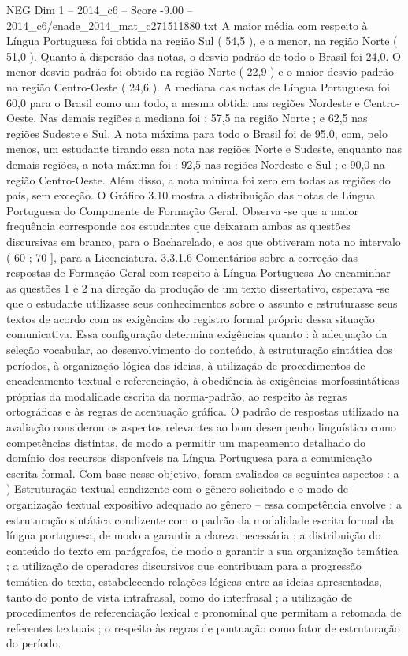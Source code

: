 \begin{textsample}{NEG Dim 1 – 2014\_c6 – Score -9.00 – 2014\_c6/enade\_2014\_mat\_c271511880.txt}
A maior média com respeito à Língua Portuguesa foi obtida na região Sul ( 54,5 ), e a menor, na região Norte ( 51,0 ).
Quanto à dispersão das notas, o desvio padrão de todo o Brasil foi 24,0.
O menor desvio padrão foi obtido na região Norte ( 22,9 ) e o maior desvio padrão na região Centro-Oeste ( 24,6 ).
A mediana das notas de Língua Portuguesa foi 60,0 para o Brasil como um todo, a mesma obtida nas regiões Nordeste e Centro-Oeste.
Nas demais regiões a mediana foi : 57,5 na região Norte ; e 62,5 nas regiões Sudeste e Sul.
A nota máxima para todo o Brasil foi de 95,0, com, pelo menos, um estudante tirando essa nota nas regiões Norte e Sudeste, enquanto nas demais regiões, a nota máxima foi : 92,5 nas regiões Nordeste e Sul ; e 90,0 na região Centro-Oeste.
Além disso, a nota mínima foi zero em todas as regiões do país, sem exceção.
O Gráfico 3.10 mostra a distribuição das notas de Língua Portuguesa do Componente de Formação Geral.
Observa -se que a maior frequência corresponde aos estudantes que deixaram ambas as questões discursivas em branco, para o Bacharelado, e aos que obtiveram nota no intervalo ( 60 ; 70 ], para a Licenciatura. 3.3.1.6 Comentários sobre a correção das respostas de Formação Geral com respeito à Língua Portuguesa Ao encaminhar as questões 1 e 2 na direção da produção de um texto dissertativo, esperava -se que o estudante utilizasse seus conhecimentos sobre o assunto e estruturasse seus textos de acordo com as exigências do registro formal próprio dessa situação comunicativa.
Essa configuração determina exigências quanto : à adequação da seleção vocabular, ao desenvolvimento do conteúdo, à estruturação sintática dos períodos, à organização lógica das ideias, à utilização de procedimentos de encadeamento textual e referenciação, à obediência às exigências morfossintáticas próprias da modalidade escrita da norma-padrão, ao respeito às regras ortográficas e às regras de acentuação gráfica.
O padrão de respostas utilizado na avaliação considerou os aspectos relevantes ao bom desempenho linguístico como competências distintas, de modo a permitir um mapeamento detalhado do domínio dos recursos disponíveis na Língua Portuguesa para a comunicação escrita formal.
Com base nesse objetivo, foram avaliados os seguintes aspectos : a ) Estruturação textual condizente com o gênero solicitado e o modo de organização textual expositivo adequado ao gênero – essa competência envolve : a estruturação sintática condizente com o padrão da modalidade escrita formal da língua portuguesa, de modo a garantir a clareza necessária ; a distribuição do conteúdo do texto em parágrafos, de modo a garantir a sua organização temática ; a utilização de operadores discursivos que contribuam para a progressão temática do texto, estabelecendo relações lógicas entre as ideias apresentadas, tanto do ponto de vista intrafrasal, como do interfrasal ; a utilização de procedimentos de referenciação lexical e pronominal que permitam a retomada de referentes textuais ; o respeito às regras de pontuação como fator de estruturação do período.

\end{textsample}
